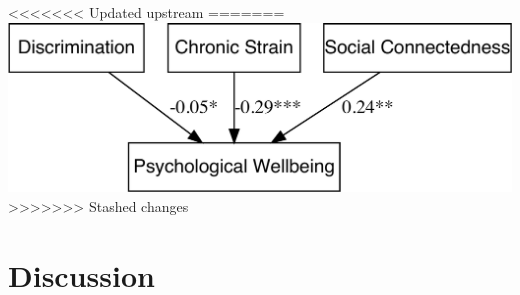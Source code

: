 \documentclass[
  english,
  man,floatsintext]{apa6}
\begin{document}
<<<<<<< Updated upstream
\hypertarget{htmlwidget-4d14c11ded899ad5f3a2}{}
=======
\includegraphics{prep_script_files/figure-latex/lavaan plot-1.pdf}
>>>>>>> Stashed changes

\hypertarget{discussion}{%
\section{Discussion}\label{discussion}}
\end{document}

